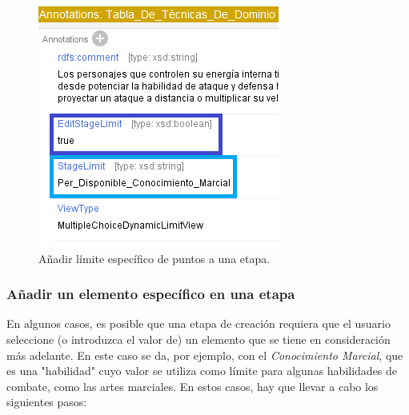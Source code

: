 \begin{figure}[H]
    \centering
    \includegraphics[scale=0.6]{Figures/Protege/MultipleChoiceGroupCost_1.png}
    \caption{Añadir límite específico de puntos a una etapa.}
    \label{MultipleChoiceGroupCost_1}
\end{figure}

\subsubsection{Añadir un elemento específico en una etapa}
En algunos casos, es posible que una etapa de creación requiera que el usuario seleccione (o introduzca el valor de) un elemento 
que se tiene en consideración más adelante. En \anima este caso se da, por ejemplo, con el \textit{Conocimiento Marcial}, que es 
una "habilidad" cuyo valor se utiliza como límite para algunas habilidades de combate, como las artes marciales. 
En estos casos, hay que llevar a cabo los siguientes pasos:

